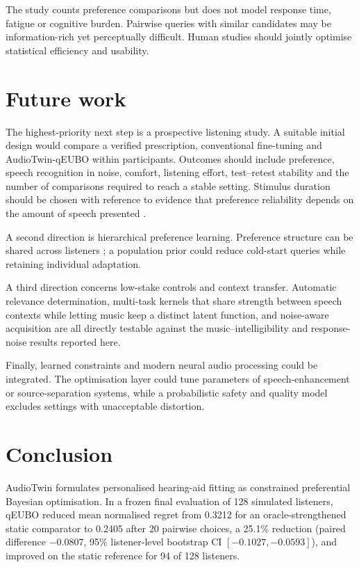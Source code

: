 \documentclass[preprint,12pt]{elsarticle}
\begin{document}
The study counts preference comparisons but does not model response time, fatigue or cognitive burden. Pairwise queries with similar candidates may be information-rich yet perceptually difficult. Human studies should jointly optimise statistical efficiency and usability.

\section{Future work}
\label{sec:future}

The highest-priority next step is a prospective listening study. A suitable initial design would compare a verified prescription, conventional fine-tuning and AudioTwin-qEUBO within participants. Outcomes should include preference, speech recognition in noise, comfort, listening effort, test--retest stability and the number of comparisons required to reach a stable setting. Stimulus duration should be chosen with reference to evidence that preference reliability depends on the amount of speech presented \cite{whitmer2022}.

A second direction is hierarchical preference learning. Preference structure can be shared across listeners \cite{birlutiu2010}; a population prior could reduce cold-start queries while retaining individual adaptation.

A third direction concerns low-stake controls and context transfer. Automatic relevance determination, multi-task kernels that share strength between speech contexts while letting music keep a distinct latent function, and noise-aware acquisition are all directly testable against the music--intelligibility and response-noise results reported here.

Finally, learned constraints and modern neural audio processing could be integrated. The optimisation layer could tune parameters of speech-enhancement or source-separation systems, while a probabilistic safety and quality model excludes settings with unacceptable distortion.

\section{Conclusion}
\label{sec:conclusion}

AudioTwin formulates personalised hearing-aid fitting as constrained preferential Bayesian optimisation. In a frozen final evaluation of 128 simulated listeners, qEUBO reduced mean normalised regret from 0.3212 for an oracle-strengthened static comparator to 0.2405 after 20 pairwise choices, a 25.1\% reduction (paired difference $-0.0807$, 95\% listener-level bootstrap CI $[-0.1027,-0.0593]$), and improved on the static reference for 94 of 128 listeners.
\end{document}
